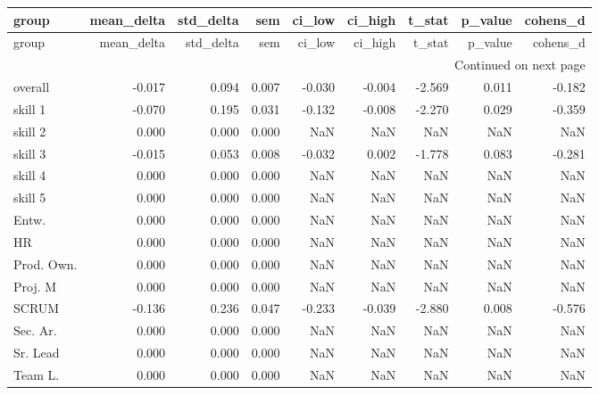 \begin{longtable}{lrrrrrrrr}
\toprule
group & mean\_delta & std\_delta & sem & ci\_low & ci\_high & t\_stat & p\_value & cohens\_d \\
\midrule
\endfirsthead
\toprule
group & mean\_delta & std\_delta & sem & ci\_low & ci\_high & t\_stat & p\_value & cohens\_d \\
\midrule
\endhead
\midrule
\multicolumn{9}{r}{Continued on next page} \\
\midrule
\endfoot
\bottomrule
\endlastfoot
overall & -0.017 & 0.094 & 0.007 & -0.030 & -0.004 & -2.569 & 0.011 & -0.182 \\
skill 1 & -0.070 & 0.195 & 0.031 & -0.132 & -0.008 & -2.270 & 0.029 & -0.359 \\
skill 2 & 0.000 & 0.000 & 0.000 & NaN & NaN & NaN & NaN & NaN \\
skill 3 & -0.015 & 0.053 & 0.008 & -0.032 & 0.002 & -1.778 & 0.083 & -0.281 \\
skill 4 & 0.000 & 0.000 & 0.000 & NaN & NaN & NaN & NaN & NaN \\
skill 5 & 0.000 & 0.000 & 0.000 & NaN & NaN & NaN & NaN & NaN \\
Entw. & 0.000 & 0.000 & 0.000 & NaN & NaN & NaN & NaN & NaN \\
HR & 0.000 & 0.000 & 0.000 & NaN & NaN & NaN & NaN & NaN \\
Prod. Own. & 0.000 & 0.000 & 0.000 & NaN & NaN & NaN & NaN & NaN \\
Proj. M & 0.000 & 0.000 & 0.000 & NaN & NaN & NaN & NaN & NaN \\
SCRUM & -0.136 & 0.236 & 0.047 & -0.233 & -0.039 & -2.880 & 0.008 & -0.576 \\
Sec. Ar. & 0.000 & 0.000 & 0.000 & NaN & NaN & NaN & NaN & NaN \\
Sr. Lead & 0.000 & 0.000 & 0.000 & NaN & NaN & NaN & NaN & NaN \\
Team L. & 0.000 & 0.000 & 0.000 & NaN & NaN & NaN & NaN & NaN \\
\end{longtable}
